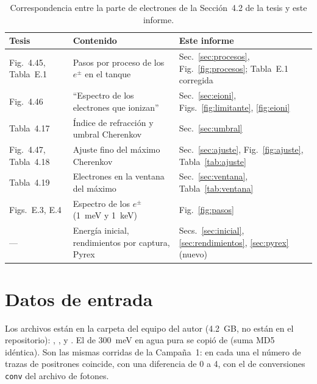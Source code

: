 \documentclass[11pt,a4paper]{article}
\newcommand{\var}[1]{\texttt{#1}}
\begin{document}
\begin{table}[H]
\centering\small
\caption{Correspondencia entre la parte de electrones de la Sección~4.2 de la tesis y este informe.}
\label{tab:correspondencia}
\begin{tabularx}{\linewidth}{@{}>{\raggedright\arraybackslash}p{3.3cm}>{\raggedright\arraybackslash}X>{\raggedright\arraybackslash}p{4.2cm}@{}}
\toprule
\textbf{Tesis} & \textbf{Contenido} & \textbf{Este informe} \\
\midrule
Fig.~4.45, Tabla~E.1 & Pasos por proceso de los $e^\pm$ en el tanque & Sec.~\ref{sec:procesos}, Fig.~\ref{fig:procesos}; Tabla~E.1 corregida \\
Fig.~4.46 & ``Espectro de los electrones que ionizan'' & Sec.~\ref{sec:eioni}, Figs.~\ref{fig:limitante}, \ref{fig:eioni} \\
Tabla~4.17 & Índice de refracción y umbral Cherenkov & Sec.~\ref{sec:umbral} \\
Fig.~4.47, Tabla~4.18 & Ajuste fino del máximo Cherenkov & Sec.~\ref{sec:ajuste}, Fig.~\ref{fig:ajuste}, Tabla~\ref{tab:ajuste} \\
Tabla~4.19 & Electrones en la ventana del máximo & Sec.~\ref{sec:ventana}, Tabla~\ref{tab:ventana} \\
Figs.~E.3, E.4 & Espectro de los $e^\pm$ (1~meV y 1~keV) & Fig.~\ref{fig:pasos} \\
--- & Energía inicial, rendimientos por captura, Pyrex & Secs.~\ref{sec:inicial}, \ref{sec:rendimientos}, \ref{sec:pyrex} (nuevo) \\
\bottomrule
\end{tabularx}
\end{table}

\section{Datos de entrada}
\label{sec:datos}

Los archivos están en la carpeta  del equipo del autor (4.2~GB, no están en el repositorio): , ,  y . El de 300~meV en agua pura se copió de  (suma MD5 idéntica). Son las mismas corridas de la Campaña~1: en cada una el número de trazas de positrones coincide, con una diferencia de 0 a 4, con el de conversiones \var{conv} del archivo de fotones.
\end{document}
